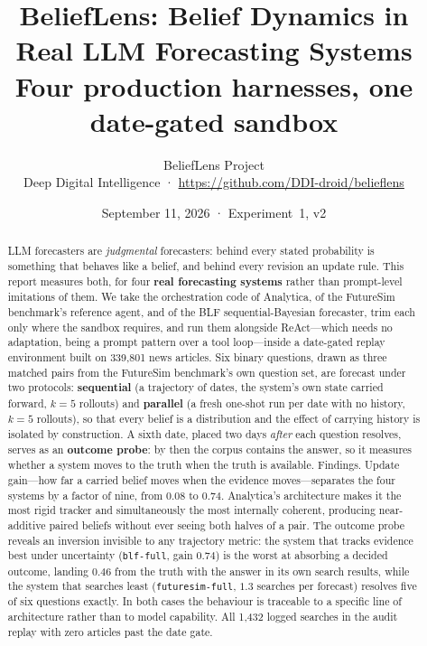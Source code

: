 \documentclass[10pt]{article}
\title{\textbf{BeliefLens: Belief Dynamics in Real LLM Forecasting Systems}\\[3pt]
\Large Four production harnesses, one date-gated sandbox}
\author{BeliefLens Project\\\small Deep Digital Intelligence \; · \;
\url{https://github.com/DDI-droid/belieflens}}
\date{September 11, 2026 \; · \; Experiment~1, v2}
\newcommand{\hr}[1]{\texttt{#1}}
\begin{document}
\maketitle

\begin{abstract}
LLM forecasters are \emph{judgmental} forecasters: behind every stated probability is something
that behaves like a belief, and behind every revision an update rule. This report measures both,
for four \textbf{real forecasting systems} rather than prompt-level imitations of them. We take the
orchestration code of Analytica, of the FutureSim benchmark's reference agent, and of the BLF
sequential-Bayesian forecaster, trim each only where the sandbox requires, and run them alongside
ReAct---which needs no adaptation, being a prompt pattern over a tool loop---inside a date-gated
replay environment built on 339{,}801 news articles. Six binary questions, drawn as three matched
pairs from the FutureSim benchmark's own question set, are forecast under two protocols:
\textbf{sequential} (a trajectory of dates, the system's own state carried forward, $k{=}5$
rollouts) and \textbf{parallel} (a fresh one-shot run per date with no history, $k{=}5$ rollouts),
so that every belief is a distribution and the effect of carrying history is isolated by
construction. A sixth date, placed two days \emph{after} each question resolves, serves as an
\textbf{outcome probe}: by then the corpus contains the answer, so it measures whether a system
moves to the truth when the truth is available.
Findings. Update gain---how far a carried belief moves when the evidence moves---separates the
four systems by a factor of nine, from $0.08$ to $0.74$. Analytica's architecture makes it the
most rigid tracker and simultaneously the most internally coherent, producing near-additive
paired beliefs without ever seeing both halves of a pair. The outcome probe reveals an inversion
invisible to any trajectory metric: the system that tracks evidence best under uncertainty
(\hr{blf-full}, gain $0.74$) is the worst at absorbing a decided outcome, landing $0.46$ from the
truth with the answer in its own search results, while the system that searches least
(\hr{futuresim-full}, $1.3$ searches per forecast) resolves five of six questions exactly. In both
cases the behaviour is traceable to a specific line of architecture rather than to model
capability. All 1{,}432 logged searches in the audit replay with zero articles past the date gate.
\end{abstract}

\end{document}
